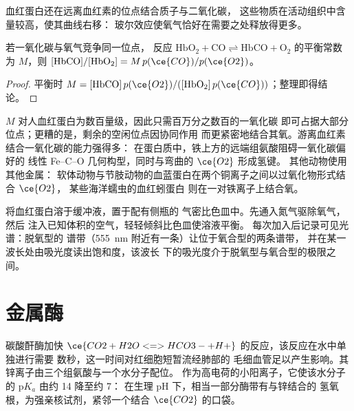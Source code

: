 血红蛋白还在远离血红素的位点结合质子与二氧化碳，
这些物质在活动组织中含量较高，使其曲线右移：
玻尔效应使氧气恰好在需要之处释放得更多。

\begin{proposition}[一氧化碳竞争]\label{prop:b3:bioinorganic:haldane}
若一氧化碳与氧气竞争同一位点，
反应 $\mathrm{HbO_2 + CO \rightleftharpoons HbCO + O_2}$ 的平衡常数为 $M$，则
$[\mathrm{HbCO}]/[\mathrm{HbO_2}] = M\,p(\ce{CO})/p(\ce{O2})$。
\end{proposition}

\begin{proof}
平衡时 $M = [\mathrm{HbCO}]\,p(\ce{O2})/([\mathrm{HbO_2}]\,p(\ce{CO}))$；整理即得结论。
\end{proof}

$M$ 对人血红蛋白为数百量级，因此只需百万分之数百的一氧化碳
即可占据大部分位点；更糟的是，剩余的空闲位点因协同作用
而更紧密地结合其氧。游离血红素结合一氧化碳的能力强得多：
在蛋白质中，铁上方的远端组氨酸阻碍一氧化碳偏好的
线性 Fe--C--O 几何构型，同时与弯曲的 $\ce{O2}$ 形成氢键。
其他动物使用其他金属：
软体动物与节肢动物的血蓝蛋白在两个铜离子之间以过氧化物形式结合 $\ce{O2}$，
某些海洋蠕虫的血红蚓蛋白
则在一对铁离子上结合氧。

\begin{inthelab}[氧结合曲线]
将血红蛋白溶于缓冲液，置于配有侧瓶的
气密比色皿中。先通入氮气驱除氧气，然后
注入已知体积的空气，轻轻倾斜比色皿使溶液平衡。
每次加入后记录可见光谱：脱氧型的
谱带（\qty{555}{nm} 附近有一条）让位于氧合型的两条谱带，
并在某一波长处由吸光度读出饱和度，该波长
下的吸光度介于脱氧型与氧合型的极限之间。
\end{inthelab}

\section{金属酶}

碳酸酐酶加快 $\ce{CO2 + H2O <=> HCO3- + H+}$ 的反应，该反应在水中单独进行需要
数秒，这一时间对红细胞短暂流经肺部的
毛细血管足以产生影响。其锌离子由三个组氨酸与一个水分子配位。
作为高电荷的小阳离子，它使该水分子的 $\mathrm pK_a$ 由约 14 降至约 7：
在生理 pH 下，相当一部分酶带有与锌结合的
氢氧根，为强亲核试剂，紧邻一个结合 $\ce{CO2}$ 的口袋。

